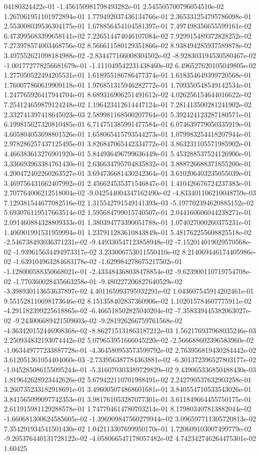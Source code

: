 04180324422e-01	-1.456150981798493282e-01	2.545505700796054510e-02	1.267061951101972894e-01	1.779492037436134766e-01	2.365331254795786098e-01	2.553008039536304175e-01	1.678856454104581397e-01	7.497498356655599161e-02	6.473995683399658141e-02	7.226514474046107084e-02	7.929915489372828252e-02	7.273978574003468756e-02	8.566611580129351866e-02	8.938494285937589878e-02	3.497552621098184988e-02	-2.834477166008304502e-02	-8.928303194530580467e-02	-1.001772778256681679e-01	-1.111049542231438460e-02	6.496527620105049805e-02	1.277050522494205531e-01	1.618955186786477374e-01	1.618354649399720568e-01	1.760077860619909118e-01	1.976851315946282772e-01	1.709350548549142534e-01	1.247765926417944704e-01	8.689316906251491612e-02	4.026256154644016622e-02	7.254124659879124248e-02	1.196423412614447124e-01	7.281413500281241902e-02	2.332741397418645023e-03	2.589981168500207764e-01	5.392424123287180571e-01	6.199815627320810485e-01	6.714751385991477584e-01	6.074639779050335919e-01	4.605804053698801526e-01	1.658065415793544273e-01	1.079983254418207944e-01	2.978286257437125495e-01	3.826847065442334772e-01	3.863231105571985902e-01	4.466383613276901920e-01	5.844936496799636449e-01	5.453288537524126900e-01	3.336693963384761430e-01	2.636634795704835832e-01	3.888726688371855200e-01	4.200472402260263527e-01	3.694736681430242364e-01	3.610206403235055039e-01	3.469756431662407992e-01	2.456624535371546847e-01	1.410426676724237383e-01	2.707764006212518004e-02	-9.042544004347162490e-02	-4.833401106210048759e-03	7.129381544677082516e-02	1.315542791549141393e-03	-5.197702394620885152e-02	5.693076119517663514e-02	1.595684799015740507e-01	2.044160606044238271e-01	2.091460884328809333e-01	1.380394773390051788e-01	1.074027000260375231e-01	1.406901991531959994e-01	1.237911283610843849e-01	5.481762255608825518e-02	-2.546738493036371231e-02	-9.449330547123858948e-02	-7.152014019029570568e-02	-1.939615634494973317e-02	3.233006753011550410e-02	8.214069446174405986e-02	-1.639104963284683178e-02	-1.629984278675217502e-01	-1.128000588350668021e-01	-2.433484368038478854e-02	-9.623900110719754708e-02	-1.770360028435663258e-01	-9.480227206827640529e-02	-3.398930113653637897e-02	4.401165993795932291e-02	1.043607545914202461e-01	9.551528110698173646e-02	8.151358402837360906e-02	1.102015784607775911e-02	-4.291182399225618865e-02	-6.466518502825040204e-02	-7.358339445382063027e-02	-9.243006689421509603e-02	-9.281926266759761568e-02	-4.363420152446908368e-02	-8.862715131863187212e-03	1.562176937968035246e-03	2.250934832193074442e-02	5.079653951666045220e-02	-2.566688602396583960e-02	-1.063449777233887728e-01	-4.364580953573599792e-02	2.763956819430284442e-02	3.612051361054404060e-03	-2.733956387784363881e-02	-6.301372396527803177e-02	-1.045285086155095244e-01	-5.316070303389729829e-02	9.439065336850488430e-03	1.819642628923442626e-02	5.679422110701988491e-02	2.242790537632903258e-01	3.260735233182918691e-01	3.496005074868601681e-01	3.840554710533543026e-01	3.841565099097742353e-01	3.981761053287077301e-01	3.611849664455750175e-01	2.611915981129288578e-01	1.747704614780703214e-01	8.179803407813882044e-02	-1.660681300624585605e-02	-1.396909847560279944e-02	3.096597711305720813e-02	7.354291934541501430e-02	1.042113307699950170e-01	1.720609103007499779e-02	-9.205376440131728122e-02	-4.058066547178057482e-02	4.742342746264475301e-02	1.60425